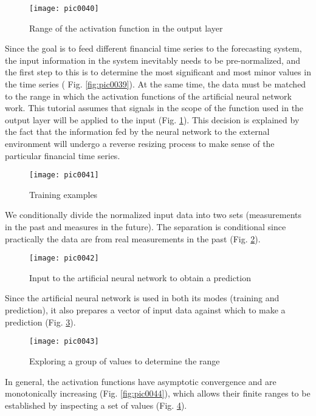 \begin{figure}[h]
\centering
\texttt{[image: pic0040]}
\caption{Range of the activation function in the output layer}
\label{fig:pic0040}
\end{figure}
\FloatBarrier

Since the goal is to feed different financial time series to the forecasting system, the input information in the system inevitably needs to be pre-normalized, and the first step to this is to determine the most significant and most minor values in the time series ( Fig. \ref{fig:pic0039}). At the same time, the data must be matched to the range in which the activation functions of the artificial neural network work. This tutorial assumes that signals in the scope of the function used in the output layer will be applied to the input (Fig. \ref{fig:pic0040}). This decision is explained by the fact that the information fed by the neural network to the external environment will undergo a reverse resizing process to make sense of the particular financial time series.

\begin{figure}[h]
\centering
\texttt{[image: pic0041]}
\caption{Training examples}
\label{fig:pic0041}
\end{figure}
\FloatBarrier

We conditionally divide the normalized input data into two sets (measurements in the past and measures in the future). The separation is conditional since practically the data are from real measurements in the past (Fig. \ref{fig:pic0041}).

\begin{figure}[h]
\centering
\texttt{[image: pic0042]}
\caption{Input to the artificial neural network to obtain a prediction}
\label{fig:pic0042}
\end{figure}
\FloatBarrier

Since the artificial neural network is used in both its modes (training and prediction), it also prepares a vector of input data against which to make a prediction (Fig. \ref{fig:pic0042}).

\begin{figure}[h]
\centering
\texttt{[image: pic0043]}
\caption{Exploring a group of values to determine the range}
\label{fig:pic0043}
\end{figure}
\FloatBarrier

In general, the activation functions have asymptotic convergence and are monotonically increasing (Fig. \ref{fig:pic0044}), which allows their finite ranges to be established by inspecting a set of values (Fig. \ref{fig:pic0043}).

